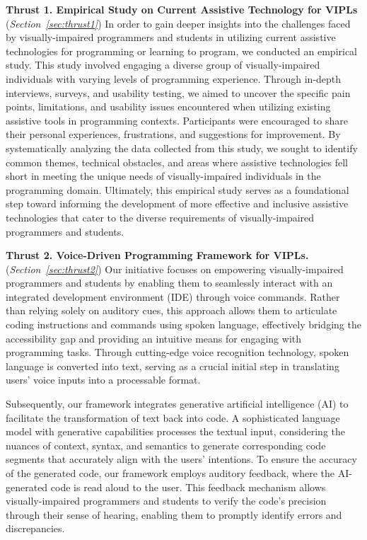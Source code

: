 \noindent \textbf{Thrust 1. Empirical Study on Current Assistive
  Technology for VIPLs} ({\em Section~\ref{sec:thrust1}}) In order to
gain deeper insights into the challenges faced by visually-impaired
programmers and students in utilizing current assistive technologies
for programming or learning to program, we conducted an empirical
study. This study involved engaging a diverse group of
visually-impaired individuals with varying levels of programming
experience. Through in-depth interviews, surveys, and usability
testing, we aimed to uncover the specific pain points, limitations,
and usability issues encountered when utilizing existing assistive
tools in programming contexts. Participants were encouraged to share
their personal experiences, frustrations, and suggestions for
improvement. By systematically analyzing the data collected from this
study, we sought to identify common themes, technical obstacles, and
areas where assistive technologies fell short in meeting the unique
needs of visually-impaired individuals in the programming
domain. Ultimately, this empirical study serves as a foundational step
toward informing the development of more effective and inclusive
assistive technologies that cater to the diverse requirements of
visually-impaired programmers and students.



\vspace{3pt}
\noindent \textbf{Thrust 2. Voice-Driven Programming Framework for
  VIPLs.}  ({\em Section~\ref{sec:thrust2}}) Our initiative focuses on
empowering visually-impaired programmers and students by enabling them
to seamlessly interact with an integrated development environment
(IDE) through voice commands. Rather than relying solely on auditory
cues, this approach allows them to articulate coding instructions and
commands using spoken language, effectively bridging the accessibility
gap and providing an intuitive means for engaging with programming
tasks. Through cutting-edge voice recognition technology, spoken
language is converted into text, serving as a crucial initial step in
translating users' voice inputs into a processable format.

Subsequently, our framework integrates generative artificial
intelligence (AI) to facilitate the transformation of text back into
code. A sophisticated language model with generative capabilities
processes the textual input, considering the nuances of context,
syntax, and semantics to generate corresponding code segments that
accurately align with the users' intentions. To ensure the accuracy of
the generated code, our framework employs auditory feedback, where the
AI-generated code is read aloud to the user. This feedback mechanism
allows visually-impaired programmers and students to verify the code's
precision through their sense of hearing, enabling them to promptly
identify errors and discrepancies.

